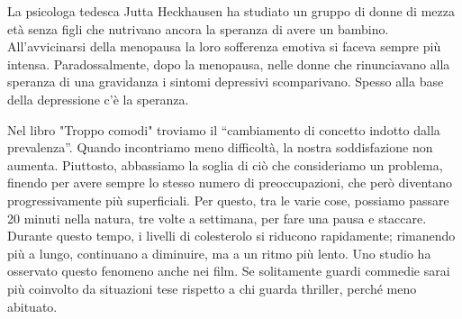 \documentclass[12pt]{book} %
\begin{document}
La psicologa tedesca Jutta Heckhausen ha studiato un gruppo di donne di mezza età senza figli che nutrivano ancora la
speranza di avere un bambino. All'avvicinarsi della menopausa la loro sofferenza emotiva si faceva
sempre più intensa. Paradossalmente, dopo la menopausa, nelle donne che rinunciavano alla speranza di una gravidanza i
sintomi depressivi scomparivano. Spesso alla base della depressione c'è la speranza. 

Nel libro "Troppo comodi" troviamo il “cambiamento di concetto indotto dalla prevalenza”. Quando incontriamo meno difficoltà, la nostra soddisfazione non aumenta. Piuttosto, abbassiamo la soglia di ciò che consideriamo un problema, finendo per avere sempre lo stesso numero di preoccupazioni, che però diventano progressivamente più superficiali. Per questo, tra le varie cose, possiamo passare 20 minuti nella natura, tre volte a settimana, per fare una pausa e staccare. Durante questo tempo, i livelli di colesterolo si riducono rapidamente; rimanendo più a lungo, continuano a diminuire, ma a un ritmo più lento. Uno studio ha osservato questo fenomeno anche nei film. Se solitamente guardi commedie sarai più coinvolto da situazioni tese rispetto a chi guarda thriller, perché meno abituato.
\end{document}
